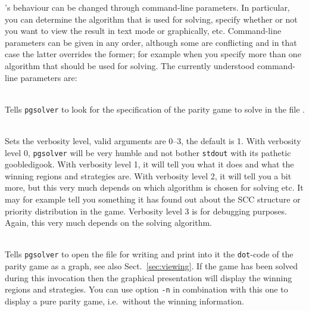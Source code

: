 \pgsolver's behaviour can be changed through command-line parameters. In particular, you can determine
the algorithm that is used for solving, specify whether or not you want to view the result in text
mode or graphically, etc. Command-line parameters can be given in any order, although some are
conflicting and in that case the latter overrides the former; for example when you specify more than
one algorithm that should be used for solving. The currently understood command-line parameters are:
\begin{description}
\itemsep3mm
\item[\nonterminal{filename}] \ \\
   Tells \texttt{pgsolver} to look for the specification of the parity game to solve in the file
   .

\item[{\ttfamily  -v \nonterminal{level}}] \ \\
   Sets the verbosity level, valid arguments are $0$--$3$, the default is 1. With verbosity level $0$,
   \texttt{pgsolver} will be very humble and not bother \texttt{stdout} with its pathetic goobledigook.
   With verbosity level 1, it will tell you what it does and what the winning regions and strategies
   are. With verbosity level 2, it will tell you a bit more, but this very much depends on which
   algorithm is chosen for solving etc. It may for example tell you something it has found out about the
   SCC structure or priority distribution in the game. Verbosity level 3 is for debugging purposes. Again,
   this very much depends on the solving algorithm.




\item[{\ttfamily -d \nonterminal{filename}}] \ \\
   Tells \texttt{pgsolver} to open the file  for writing and print into it the
   \texttt{dot}-code of the parity game as a graph, see also Sect.~\ref{sec:viewing}. If the game has
   been solved during this invocation then the graphical presentation will display the winning regions
   and strategies. You can use option \texttt{-n} in combination with this one to display a pure parity
   game, i.e.\ without the winning information.


\end{description}

